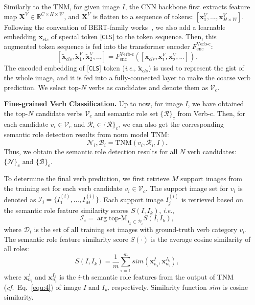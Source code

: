 \documentclass[letterpaper]{article} %
\newcommand{\ie}{\textit{i}.\textit{e}.}
\newcommand{\cf}{\textit{cf.}}
\begin{document}
Similarly to the TNM, for given image $I$, the CNN backbone first extracts feature map $\bm{X}^V \in \mathbb{R}^{C\times H\times W}$, and $\bm{X}^V$ is flatten to a sequence of tokens: $[\bm{x}^V_1, ..., \bm{x}^V_{H\times W}]$. Following the convention of BERT-family works~\cite{devlin2018bert}, we also add a learnable embedding $\bm{x}_{cls}$ of special token [\texttt{CLS}] to the token sequence. Then, this augmented token sequence is fed into the transformer encoder $F^{\text{Verb-c}}_{\text{enc}}$:
\begin{equation} \label{equ:6}
    \left[ \tilde{\bm{x}}_{cls}, \tilde{\bm{x}}^V_1, \tilde{\bm{x}}^V_2, ... \right] = F^{\text{Verb-c}}_{\text{enc}} (\left[\bm{x}_{cls}, \bm{x}^V_1, \bm{x}^V_2, ... \right]).
\end{equation}
The encoded embedding of [\texttt{CLS}] token (\ie, $\tilde{\bm{x}}_{cls}$) is used to represent the gist of the whole image, and it is fed into a fully-connected layer to make the coarse verb prediction. We select top-$N$ verbs as candidates and denote them as $\mathcal{V}_c$.





\noindent\textbf{Fine-grained Verb Classification.} Up to now, for image $I$, we have obtained the top-$N$ candidate verbs $\mathcal{V}_c$ and semantic role set $\{\mathcal{R}\}_c$ from Verb-c. Then, for each candidate $v_i \in \mathcal{V}_c$ and $\mathcal{R}_i \in \{\mathcal{R}\}_c$, we can also get the corresponding semantic role detection results from noun model TNM:
\begin{equation}
    \mathcal{N}_i, \mathcal{B}_i = \text{TNM} (v_i, \mathcal{R}_i, I).
\end{equation}
Thus, we obtain the semantic role detection results for all $N$ verb candidates: $\{\mathcal{N}\}_c$ and $\{\mathcal{B}\}_c$.

To determine the final verb prediction, we first retrieve $M$ support images from the training set for each verb candidate $v_i \in \mathcal{V}_c$. The support image set for $v_i$ is denoted as $\mathcal{I}_i = \{I^{(i)}_1, ..., I^{(i)}_M \}$. Each support image $I^{(i)}_j$ is retrieved based on the semantic role feature similarity scores $S(I, I_k)$, \ie,
\begin{equation}
\mathcal{I}_i = \arg\text{top-M}_{I_k \in \mathcal{D}_i} S(I, I_k),
\end{equation}
where $\mathcal{D}_i$ is the set of all training set images with ground-truth verb category $v_i$. The semantic role feature similarity score $S(\cdot)$ is the average cosine similarity of all roles:
\begin{equation}
    S(I, I_k) = \frac{1}{m} \sum_{i=1}^{m} sim(\bm{x}_{n_i}^{I},\bm{x}_{n_i}^{I_k}),
\end{equation}
where $\bm{x}_{n_i}^{I}$ and $\bm{x}_{n_i}^{I_k}$ is the $i$-th semantic role features from the output of TNM (\cf~Eq.~\eqref{equ:4}) of image $I$ and $I_k$, respectively. Similarity function $sim$ is cosine similarity.
\end{document}
